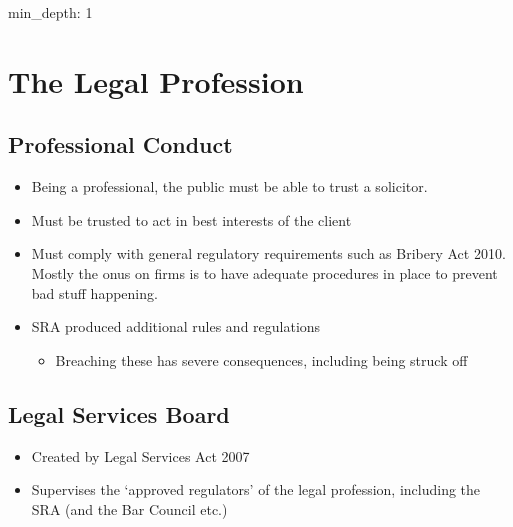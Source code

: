 \documentclass[
]{article}
\author{}
\date{}
\newenvironment{Shaded}{}{}
\newcommand{\NormalTok}[1]{#1}
\providecommand{\tightlist}{%
  \setlength{\itemsep}{0pt}\setlength{\parskip}{0pt}}
\begin{document}
{
\setcounter{tocdepth}{3}
\tableofcontents
}
\begin{Shaded}
\begin{Highlighting}[]
\NormalTok{min\_depth: 1}
\end{Highlighting}
\end{Shaded}

\hypertarget{the-legal-profession}{%
\section{The Legal Profession}\label{the-legal-profession}}

\hypertarget{professional-conduct}{%
\subsection{Professional Conduct}\label{professional-conduct}}

\begin{itemize}
\tightlist
\item
  Being a professional, the public must be able to trust a solicitor.
\item
  Must be trusted to act in best interests of the client
\item
  Must comply with general regulatory requirements such as Bribery Act
  2010. Mostly the onus on firms is to have adequate procedures in place
  to prevent bad stuff happening.
\item
  SRA produced additional rules and regulations

  \begin{itemize}
  \tightlist
  \item
    Breaching these has severe consequences, including being struck off
  \end{itemize}
\end{itemize}

\hypertarget{legal-services-board}{%
\subsection{Legal Services Board}\label{legal-services-board}}

\begin{itemize}
\tightlist
\item
  Created by Legal Services Act 2007
\item
  Supervises the `approved regulators' of the legal profession,
  including the SRA (and the Bar Council etc.)
\end{itemize}
\end{document}
